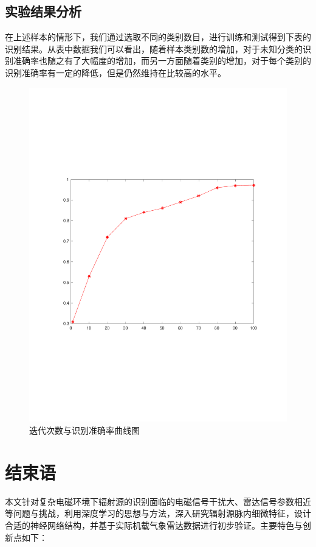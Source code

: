 \subsection{实验结果分析}

在上述样本的情形下，我们通过选取不同的类别数目，进行训练和测试得到下表的识别结果。从表中数据我们可以看出，随着样本类别数的增加，对于未知分类的识别准确率也随之有了大幅度的增加，而另一方面随着类别的增加，对于每个类别的识别准确率有一定的降低，但是仍然维持在比较高的水平。
\begin{figure}
	\centering
	\includegraphics{figures/diff_epoch.pdf}
	\caption{迭代次数与识别准确率曲线图}
\end{figure}






\section{结束语}

本文针对复杂电磁环境下辐射源的识别面临的电磁信号干扰大、雷达信号参数相近等问题与挑战，利用深度学习的思想与方法，深入研究辐射源脉内细微特征，设计合适的神经网络结构，并基于实际机载气象雷达数据进行初步验证。主要特色与创新点如下：


